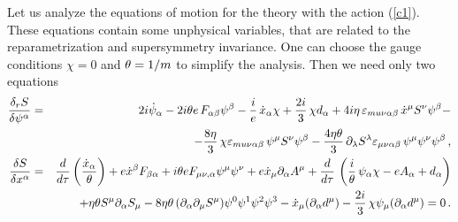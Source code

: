 Let us analyze the equations of motion for the 
theory with the action (\ref{c1}).
These equations contain some unphysical variables, that are
related to the reparametrization and supersymmetry invariance.
One can choose  the gauge conditions $\chi=0$ and $\theta=1/m$ to 
simplify the analysis. Then we need only two equations
\begin{eqnarray}
\label{c3}
\frac{\delta_r S}{\delta\psi^\alpha} &=& 2i\dot{\psi}_\alpha
- 2i\theta e\,F_{\alpha\beta}\psi^\beta - \frac{i}{e}\,\dot{x}_\alpha\chi
+ \frac{2i}{3}\,\chi d_\alpha
+ 4i\eta\,\varepsilon_{mu\nu\alpha\beta}\,\dot{x}^\mu S^\nu\psi^\beta -
\nonumber \\
&& - \frac{8\eta}{3}\,\chi\varepsilon_{mu\nu\alpha\beta}\,\psi^\mu S^\nu\psi^\beta
- \frac{4\eta \theta}{3}\,\partial_\lambda S^\lambda
\varepsilon_{\mu\nu\alpha\beta}\,\psi^\mu \psi^\nu\psi^\beta\,,    \\
\label{c5}
\frac{\delta S}{\delta x^\alpha} &=&
\frac{d}{d\tau}\left(\frac{\dot{x}_\alpha}{\theta}\right)
+ e\dot{x}^\beta F_{\beta\alpha}
+ i\theta e F_{\mu\nu,\alpha}\psi^\mu\psi^\nu
+ e\dot{x}_\mu\partial_\alpha A^\mu
+ \frac{d}{d\tau}\,\left(
\frac{i}{\theta}\,\psi_\alpha \chi - eA_\alpha + d_\alpha \right) \nonumber \\
&&+ \eta \theta S^\mu\partial_\alpha S_\mu
- 8\eta \theta\, (\partial_\alpha\partial_\mu S^\mu)\psi^0 \psi^1 \psi^2 \psi^3
- \dot{x}_\mu  (\partial_\alpha d^\mu)
- \frac{2i}{3}\,\chi\psi_\mu  (\partial_\alpha d^\mu) = 0 \label{c6}\,.
\end{eqnarray}

